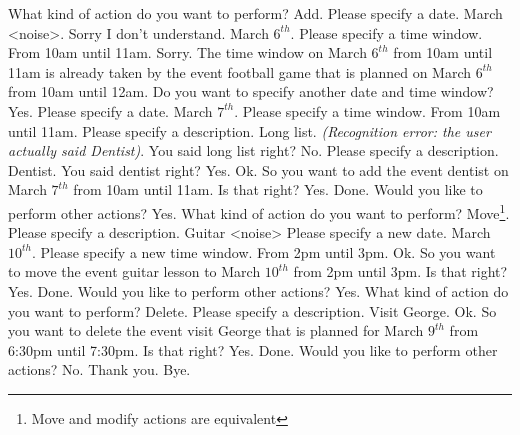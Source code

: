 \begin{itemize}
						\begin{dialogue}
								 What kind of action do you want to perform?
								 Add.
								 Please specify a date.
								 March <noise>.
								 Sorry I don't understand.
								 March $6^{th}$.
								 Please specify a time window.
								 From 10am until 11am.
								 Sorry. The time window on March $6^{th}$ from 10am until 11am is already taken by the event football game that is planned on March $6^{th}$ from 10am until 12am. Do you want to specify another date and time window?
								 Yes.
								 Please specify a date.
								 March $7^{th}$.
								 Please specify a time window.
								 From 10am until 11am.
								 Please specify a description.
								 Long list. \textit{(Recognition error: the user actually said Dentist)}.
								 You said long list right?
								 No.
								 Please specify a description.
								 Dentist.
								 You said dentist right?
								 Yes.
								 Ok. So you want to add the event dentist on March $7^{th}$ from 10am until 11am. Is that right?
								 Yes.
								 Done. Would you like to perform other actions?
								 Yes.
								 What kind of action do you want to perform?
								 Move\footnote{Move and modify actions are equivalent}.
								 Please specify a description.
								 Guitar <noise>
								 Please specify a new date.
								 March $10^{th}$.
								 Please specify a new time window.
								 From 2pm until 3pm.
								 Ok. So you want to move the event guitar lesson to March $10^{th}$ from 2pm until 3pm. Is that right?
								 Yes.
								 Done. Would you like to perform other actions?
								 Yes.
								 What kind of action do you want to perform?
								 Delete.
								 Please specify a description.
								 Visit George.
								 Ok. So you want to delete the event visit George that is planned for March $9^{th}$ from 6:30pm until 7:30pm. Is that right?
								 Yes.
								 Done. Would you like to perform other actions?
								 No.
								 Thank you. Bye.
						\end{dialogue}


\end{itemize}
